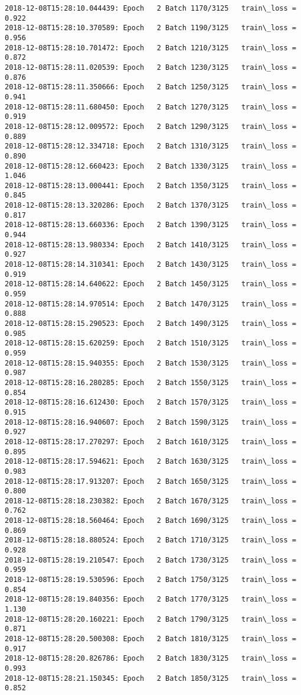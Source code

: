 \documentclass[11pt]{article}
\begin{document}
\begin{Verbatim}[commandchars=\\\{\}]
2018-12-08T15:28:10.044439: Epoch   2 Batch 1170/3125   train\_loss = 0.922
2018-12-08T15:28:10.370589: Epoch   2 Batch 1190/3125   train\_loss = 0.956
2018-12-08T15:28:10.701472: Epoch   2 Batch 1210/3125   train\_loss = 0.872
2018-12-08T15:28:11.020539: Epoch   2 Batch 1230/3125   train\_loss = 0.876
2018-12-08T15:28:11.350666: Epoch   2 Batch 1250/3125   train\_loss = 0.941
2018-12-08T15:28:11.680450: Epoch   2 Batch 1270/3125   train\_loss = 0.919
2018-12-08T15:28:12.009572: Epoch   2 Batch 1290/3125   train\_loss = 0.889
2018-12-08T15:28:12.334718: Epoch   2 Batch 1310/3125   train\_loss = 0.890
2018-12-08T15:28:12.660423: Epoch   2 Batch 1330/3125   train\_loss = 1.046
2018-12-08T15:28:13.000441: Epoch   2 Batch 1350/3125   train\_loss = 0.845
2018-12-08T15:28:13.320286: Epoch   2 Batch 1370/3125   train\_loss = 0.817
2018-12-08T15:28:13.660336: Epoch   2 Batch 1390/3125   train\_loss = 0.944
2018-12-08T15:28:13.980334: Epoch   2 Batch 1410/3125   train\_loss = 0.927
2018-12-08T15:28:14.310341: Epoch   2 Batch 1430/3125   train\_loss = 0.919
2018-12-08T15:28:14.640622: Epoch   2 Batch 1450/3125   train\_loss = 0.959
2018-12-08T15:28:14.970514: Epoch   2 Batch 1470/3125   train\_loss = 0.888
2018-12-08T15:28:15.290523: Epoch   2 Batch 1490/3125   train\_loss = 0.985
2018-12-08T15:28:15.620259: Epoch   2 Batch 1510/3125   train\_loss = 0.959
2018-12-08T15:28:15.940355: Epoch   2 Batch 1530/3125   train\_loss = 0.987
2018-12-08T15:28:16.280285: Epoch   2 Batch 1550/3125   train\_loss = 0.854
2018-12-08T15:28:16.612430: Epoch   2 Batch 1570/3125   train\_loss = 0.915
2018-12-08T15:28:16.940607: Epoch   2 Batch 1590/3125   train\_loss = 0.927
2018-12-08T15:28:17.270297: Epoch   2 Batch 1610/3125   train\_loss = 0.895
2018-12-08T15:28:17.594621: Epoch   2 Batch 1630/3125   train\_loss = 0.983
2018-12-08T15:28:17.913207: Epoch   2 Batch 1650/3125   train\_loss = 0.800
2018-12-08T15:28:18.230382: Epoch   2 Batch 1670/3125   train\_loss = 0.762
2018-12-08T15:28:18.560464: Epoch   2 Batch 1690/3125   train\_loss = 0.869
2018-12-08T15:28:18.880524: Epoch   2 Batch 1710/3125   train\_loss = 0.928
2018-12-08T15:28:19.210547: Epoch   2 Batch 1730/3125   train\_loss = 0.959
2018-12-08T15:28:19.530596: Epoch   2 Batch 1750/3125   train\_loss = 0.854
2018-12-08T15:28:19.840356: Epoch   2 Batch 1770/3125   train\_loss = 1.130
2018-12-08T15:28:20.160221: Epoch   2 Batch 1790/3125   train\_loss = 0.871
2018-12-08T15:28:20.500308: Epoch   2 Batch 1810/3125   train\_loss = 0.917
2018-12-08T15:28:20.826786: Epoch   2 Batch 1830/3125   train\_loss = 0.993
2018-12-08T15:28:21.150345: Epoch   2 Batch 1850/3125   train\_loss = 0.852

\end{Verbatim}
\end{document}
